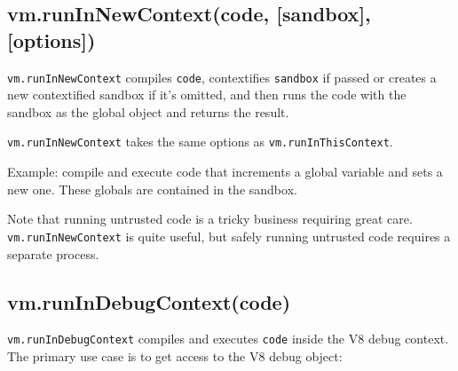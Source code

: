 \subsection{vm.runInNewContext(code, {[}sandbox{]},
{[}options{]})}\label{vm.runinnewcontextcode-sandbox-options}

\texttt{vm.runInNewContext} compiles \texttt{code}, contextifies
\texttt{sandbox} if passed or creates a new contextified sandbox if it's
omitted, and then runs the code with the sandbox as the global object
and returns the result.

\texttt{vm.runInNewContext} takes the same options as
\texttt{vm.runInThisContext}.

Example: compile and execute code that increments a global variable and
sets a new one. These globals are contained in the sandbox.

\begin{Shaded}
\begin{Highlighting}[]
 \NormalTok{(}\NormalTok{);}
 \NormalTok{(}\NormalTok{),}

 
  \NormalTok{: }\NormalTok{,}
  \NormalTok{: }
\NormalTok{\};}

\NormalTok{(}
\NormalTok{(}

\end{Highlighting}
\end{Shaded}

Note that running untrusted code is a tricky business requiring great
care. \texttt{vm.runInNewContext} is quite useful, but safely running
untrusted code requires a separate process.

\subsection{vm.runInDebugContext(code)}\label{vm.runindebugcontextcode}

\texttt{vm.runInDebugContext} compiles and executes \texttt{code} inside
the V8 debug context. The primary use case is to get access to the V8
debug object:

